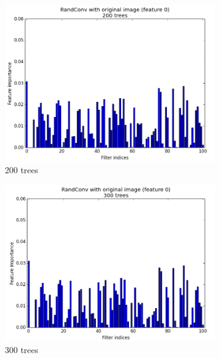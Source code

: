 \documentclass[a4paper]{report}
\begin{document}
\begin{figure}
\begin{subfigure}{.5\textwidth}
				\includegraphics[width=1.\linewidth]{images/FI200trees.png}
				\caption{\label{fig:FI200trees}200 trees}
			\end{subfigure}%
			\begin{subfigure}{.5\textwidth}
				\centering
				\includegraphics[width=1.\linewidth]{images/FI300trees.png}
				\caption{\label{fig:FI300trees}300 trees}
			\end{subfigure}
			\begin{subfigure}{.5\textwidth}
				\centering

\end{subfigure}
\end{figure}
\end{document}
